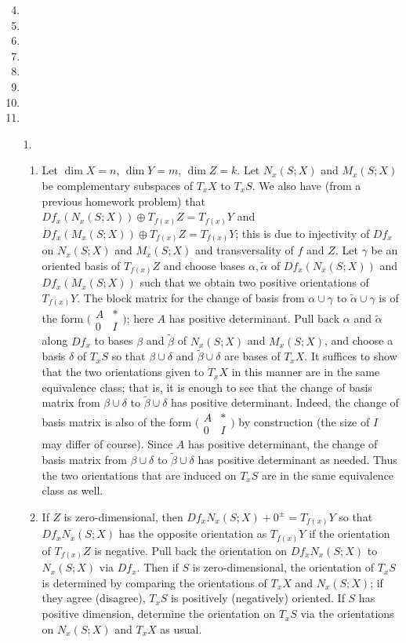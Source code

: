 \documentclass[11pt,leqno]{article}
\theoremstyle{plain}
\theoremstyle{definition}
\numberwithin{equation}{section}
\numberwithin{lem}{section}
\begin{document}
\begin{enumerate}
    \setcounter{enumi}{3}
    \item 
    \item 
    \item 
    \item 
    \item 
    \item 
    \item 
    \item 
    \item[1.] \begin{enumerate}
        \item Let $\dim X = n$, $\dim Y = m$, $\dim Z = k$. Let $N_x(S;X)$ and $M_x(S;X)$ be complementary subspaces of $T_xX$ to $T_xS$. We also have (from a previous homework problem) that $Df_x(N_x(S;X)) \oplus T_{f(x)}Z = T_{f(x)}Y$ and $Df_x(M_x(S;X)) \oplus T_{f(x)}Z = T_{f(x)}Y$; this is due to injectivity of $Df_x$ on $N_x(S;X)$ and $M_x(S;X)$ and transversality of $f$ and $Z$. Let $\gamma$ be an oriented basis of $T_{f(x)}Z$ and choose bases $\alpha,\tilde\alpha$ of $Df_x(N_x(S;X))$ and $Df_x(M_x(S;X))$ such that we obtain two positive orientations of $T_{f(x)}Y$. The block matrix for the change of basis from $\alpha\cup\gamma$ to $\tilde\alpha\cup\gamma$ is of the form $\big(\!\begin{smallmatrix}
            A & \ast \\ 0 & I
        \end{smallmatrix}\!\big)$; here $A$ has positive determinant. Pull back $\alpha$ and $\tilde\alpha$ along $Df_x$ to bases $\beta$ and $\tilde\beta$ of $N_x(S;X)$ and $M_x(S;X)$, and choose a basis $\delta$ of $T_xS$ so that $\beta\cup\delta$ and $\tilde\beta\cup\delta$ are bases of $T_xX$. It suffices to show that the two orientations given to $T_xX$ in this manner are in the same equivalence class; that is, it is enough to see that the change of basis matrix from $\beta\cup\delta$ to $\tilde\beta\cup\delta$ has positive determinant. Indeed, the change of basis matrix is also of the form $\big(\!\begin{smallmatrix}
            A & \ast \\ 0 & I
        \end{smallmatrix}\!\big)$ by construction (the size of $I$ may differ of course). Since $A$ has positive determinant, the change of basis matrix from $\beta\cup\delta$ to $\tilde\beta\cup\delta$ has positive determinant as needed. Thus the two orientations that are induced on $T_xS$ are in the same equivalence class as well.
        \item If $Z$ is zero-dimensional, then $Df_xN_x(S;X) + 0^\pm = T_{f(x)}Y$ so that $Df_xN_x(S;X)$ has the opposite orientation as $T_{f(x)}Y$ if the orientation of $T_{f(x)}Z$ is negative. Pull back the orientation on $Df_xN_x(S;X)$ to $N_x(S;X)$ via $Df_x$. Then if $S$ is zero-dimensional, the orientation of $T_xS$ is determined by comparing the orientations of $T_xX$ and $N_x(S;X)$; if they agree (disagree), $T_xS$ is positively (negatively) oriented. If $S$ has positive dimension, determine the orientation on $T_xS$ via the orientations on $N_x(S;X)$ and $T_xX$ as usual. 
        

\end{enumerate}
\end{enumerate}
\end{document}
